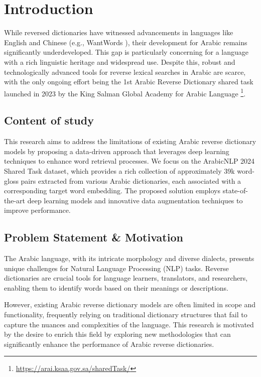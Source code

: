 \documentclass[15pt]{article}
\begin{document}
\section{Introduction}

While reversed dictionaries have witnessed advancements in languages like English and Chinese (e.g., WantWords \cite{Qi2020}), their development for Arabic remains significantly underdeveloped. This gap is particularly concerning for a language with a rich linguistic heritage and widespread use. Despite this, robust and technologically advanced tools for reverse lexical searches in Arabic are scarce, with the only ongoing effort being the 1st Arabic Reverse Dictionary shared task launched in 2023 by the King Salman Global Academy for Arabic Language \footnote{\url{https://arai.ksaa.gov.sa/sharedTask/}}.


\subsection{Content of study}

This research aims to address the limitations of existing Arabic reverse dictionary models by proposing a data-driven approach that leverages deep learning techniques to enhance word retrieval processes. We focus on the ArabicNLP 2024 Shared Task dataset, which provides a rich collection of approximately 39k word-gloss pairs extracted from various Arabic dictionaries, each associated with a corresponding target word embedding. The proposed solution employs state-of-the-art deep learning models and innovative data augmentation techniques to improve performance.

\subsection{Problem Statement \& Motivation}

The Arabic language, with its intricate morphology and diverse dialects, presents unique challenges for Natural Language Processing (NLP) tasks. Reverse dictionaries are crucial tools for language learners, translators, and researchers, enabling them to identify words based on their meanings or descriptions.

However, existing Arabic reverse dictionary models are often limited in scope and functionality, frequently relying on traditional dictionary structures that fail to capture the nuances and complexities of the language. This research is motivated by the desire to enrich this field by exploring new methodologies that can significantly enhance the performance of Arabic reverse dictionaries.
\end{document}
